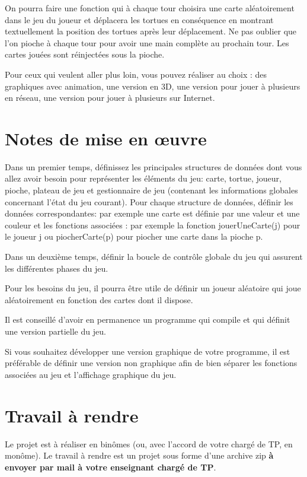 \documentclass[10pt]{article}
\begin{document}
On pourra faire une fonction qui à chaque tour choisira une carte
aléatoirement dans le jeu du joueur et déplacera les tortues en
conséquence en montrant textuellement la position des tortues après
leur déplacement. Ne pas oublier que l'on pioche à chaque tour pour
avoir une main complète au prochain tour. Les cartes jouées sont
réinjectées sous la pioche.

Pour ceux qui veulent aller plus loin, vous pouvez réaliser au choix
: des graphiques avec animation, une version en 3D, une version pour
jouer à plusieurs en réseau, une version pour jouer à plusieurs sur Internet.

\section{Notes de mise en {\oe}uvre}

Dans un premier temps, définissez les principales structures de données dont vous allez avoir besoin pour représenter les éléments du jeu: carte, tortue, joueur, pioche, plateau de jeu et gestionnaire de jeu (contenant les informations globales concernant l'état du jeu courant). Pour chaque structure de données, définir les données correspondantes: par exemple une carte est définie par une valeur et une couleur et les fonctions associées : par exemple la fonction jouerUneCarte(j) pour le joueur j ou piocherCarte(p) pour piocher une carte dans la pioche p.

Dans un deuxième temps, définir la boucle de contrôle globale du jeu qui assurent les différentes phases du jeu.

Pour les besoins du jeu, il pourra être utile de définir un joueur aléatoire qui joue aléatoirement en fonction des cartes dont il dispose.

Il est conseillé d'avoir en permanence un programme qui compile et qui définit une version partielle du jeu.

Si vous souhaitez développer une version graphique de votre programme, il est préférable de définir une version non graphique afin de bien séparer les fonctions associées au jeu et l'affichage graphique du jeu.

\section{Travail à rendre}
Le projet est à réaliser en binômes (ou, avec l'accord de votre 
chargé de TP, en monôme). Le travail à rendre est un projet sous forme 
d'une archive zip {\bf à envoyer par mail à votre enseignant chargé de TP}. 
\end{document}
